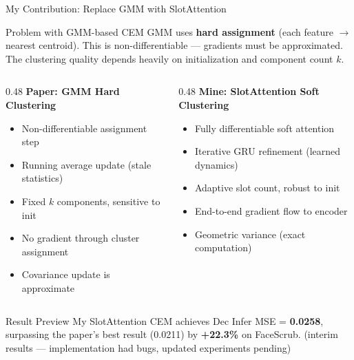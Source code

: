 \documentclass[aspectratio=169, 10pt]{beamer}
\newcommand{\fix}[1]{\textcolor{goodgreen}{\textbf{#1}}}
\newcommand{\good}[1]{\textcolor{goodgreen}{#1}}
\newcommand{\bad}[1]{\textcolor{bugred}{#1}}
\begin{document}
\begin{frame}{My Contribution: Replace GMM with SlotAttention}

\begin{block}{Problem with GMM-based CEM}
\small GMM uses \textbf{hard assignment} (each feature $\to$ nearest centroid). This is non-differentiable --- gradients must be approximated. The clustering quality depends heavily on initialization and component count $k$.
\end{block}

\vspace{0.15cm}
\begin{columns}[T]
\begin{column}{0.48\textwidth}
\textbf{\bad{Paper: GMM Hard Clustering}}
\small
\begin{itemize}\setlength{\itemsep}{2pt}
    \item Non-differentiable assignment step
    \item Running average update (stale statistics)
    \item Fixed $k$ components, sensitive to init
    \item No gradient through cluster assignment
    \item Covariance update is approximate
\end{itemize}
\end{column}
\begin{column}{0.48\textwidth}
\textbf{\fix{Mine: SlotAttention Soft Clustering}}
\small
\begin{itemize}\setlength{\itemsep}{2pt}
    \item \good{Fully differentiable} soft attention
    \item Iterative GRU refinement (learned dynamics)
    \item Adaptive slot count, robust to init
    \item \good{End-to-end gradient flow} to encoder
    \item Geometric variance (exact computation)
\end{itemize}
\end{column}
\end{columns}

\vspace{0.15cm}
\begin{alertblock}{\small Result Preview}
\small My SlotAttention CEM achieves Dec Infer MSE = \textbf{0.0258}, surpassing the paper's best result (0.0211) by \good{\textbf{+22.3\%}} on FaceScrub. {\scriptsize\color{warnorg}(interim results --- implementation had bugs, updated experiments pending)}
\end{alertblock}

\end{frame}
\end{document}
